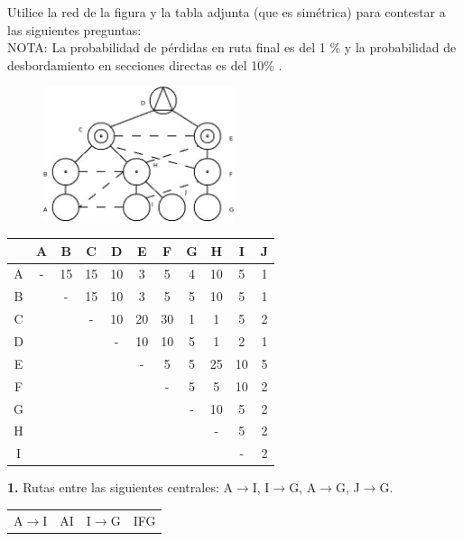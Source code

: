 \begin{exercise}[10]
Utilice la red de la figura y la tabla adjunta (que es simétrica) para contestar a las siguientes preguntas:\\
NOTA: La probabilidad de pérdidas en ruta final es del 1 \% y la probabilidad de desbordamiento en secciones directas es del 10\% .
\begin{figure}[H]
\centering
\includegraphics[width=0.5\textwidth]{Imagen/ejercicio10tema1.jpg}
\label{}
\end{figure}
\begin{center}
\begin{tabular}{| c | c | c | c | c | c | c | c | c | c | c |}
\hline
   & A & B  & C  & D  & E  & F  & G & H  & I  & J  \\\hline
 A & - & 15 & 15 & 10 & 3  & 5  & 4 & 10 & 5  & 1  \\\hline
 B &   & -  & 15 & 10 & 3  & 5  & 5 & 10 & 5  & 1  \\\hline
 C &   &    & -  & 10 & 20 & 30 & 1 & 1  & 5  & 2  \\\hline
 D &   &    &    & -  & 10 & 10 & 5 & 1  & 2  & 1  \\\hline
 E &   &    &    &    & -  & 5  & 5 & 25 & 10 & 5  \\\hline
 F &   &    &    &    &    & -  & 5 & 5  & 10 & 2  \\\hline
 G &   &    &    &    &    &    & - & 10 & 5  & 2  \\\hline
 H &   &    &    &    &    &    &   & -  & 5  & 2  \\\hline
 I &   &    &    &    &    &    &   &    & -  & 2  \\\hline
\end{tabular}
\end{center}
\textbf{1.} Rutas entre las siguientes centrales: A$\to$I, I$\to$G, A$\to$G, J$\to$G.\\
\begin{center}
\begin{tabular}{c c c c}
A$\to$I & AI  		& I$\to$G 	& IFG 		\\

\end{tabular}
\end{center}
\end{exercise}
